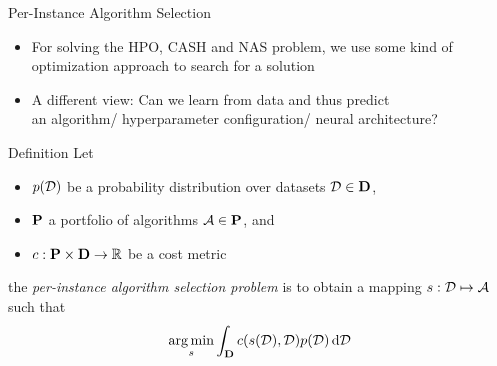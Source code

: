 \begin{frame}[c]{Per-Instance Algorithm Selection}

\begin{itemize}
	\item For solving the HPO, CASH and NAS problem, we use some kind of optimization approach to \alert{search} for a solution
	\pause
	\item A different view: Can we learn from data and thus \alert{predict}\\ an algorithm/ hyperparameter configuration/ neural architecture?
\end{itemize}

\pause
\begin{block}{Definition}
	Let 
	\begin{itemize}
		\item $p(\mathcal{D})$ be a probability \alert{distribution} over datasets $\mathcal{D} \in \mathbf{D}$,
		\pause
		\item $\mathbf{P}$ a portfolio of algorithms $\mathcal{A} \in \mathbf{P}$, and
		\pause
		\item $c: \mathbf{P} \times \mathbf{D} \rightarrow \mathbb{R}$ be a cost metric   
	\end{itemize}
	
	\pause
	the \emph{per-instance algorithm selection problem} is to obtain a mapping 
	$s: \mathcal{D} \mapsto \mathcal{A}$ 
	such that
	$$\operatorname*{arg\,min}_{s} \int_{\mathbf{D}} c(s(\mathcal{D}),\mathcal{D}) p(\mathcal{D}) \mathop{}\!\mathrm{d}\mathcal{D}$$
\end{block}

\end{frame}
